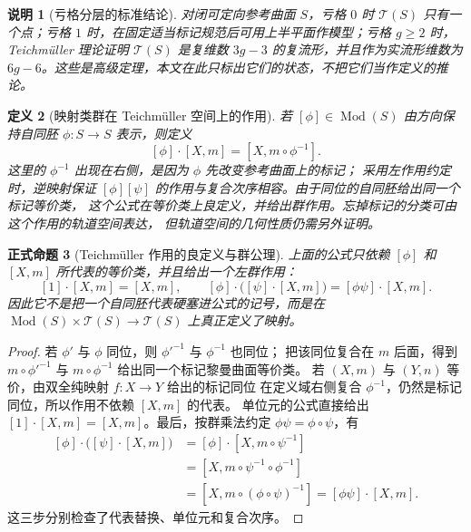 \documentclass[UTF8,fontset=none,a4paper,11pt]{ctexart}
\theoremstyle{foundation-definition}
\newtheorem{definition}{定义}[section]
\theoremstyle{foundation-theorem}
\theoremstyle{foundation-proposition}
\newtheorem{proposition}[definition]{正式命题}
\theoremstyle{foundation-example}
\theoremstyle{foundation-remark}
\newtheorem{remark}[definition]{说明}
\theoremstyle{foundation-theorem}
\newcommand{\T}{\mathcal T}
\newcommand{\Mod}{\operatorname{Mod}}
\begin{document}
\begin{remark}[亏格分层的标准结论]
对闭可定向参考曲面 \(S\)，亏格 \(0\) 时 \(\T(S)\) 只有一个点；亏格 \(1\) 时，在固定适当标记规范后可用上半平面作模型；亏格 \(g\geq2\) 时，Teichmüller 理论证明 \(\T(S)\) 是复维数 \(3g-3\) 的复流形，并且作为实流形维数为 \(6g-6\)。这些是高级定理，本文在此只标出它们的状态，不把它们当作定义的推论。
\end{remark}

\begin{definition}[映射类群在 Teichmüller 空间上的作用]\label{def:teich-action}
若 \([\phi]\in\Mod(S)\) 由方向保持自同胚 \(\phi:S\to S\) 表示，则定义
\[
[\phi]\cdot[X,m]=[X,m\circ\phi^{-1}].
\]
这里的 \(\phi^{-1}\) 出现在右侧，是因为 \(\phi\) 先改变参考曲面上的标记；
采用左作用约定时，逆映射保证
\([ \phi ][ \psi ]\) 的作用与复合次序相容。由于同位的自同胚给出同一个标记等价类，
这个公式在等价类上良定义，并给出群作用。忘掉标记的分类可由这个作用的轨道空间表达，
但轨道空间的几何性质仍需另外证明。
\end{definition}

\begin{proposition}[Teichmüller 作用的良定义与群公理]\label{prop:teich-action-well-defined}
上面的公式只依赖 \([\phi]\) 和 \([X,m]\) 所代表的等价类，并且给出一个左群作用：
\[
[1]\cdot[X,m]=[X,m],\qquad
[\phi]\cdot\bigl([\psi]\cdot[X,m]\bigr)
=[\phi\psi]\cdot[X,m].
\]
因此它不是把一个自同胚代表硬塞进公式的记号，而是在
\(\Mod(S)\times\T(S)\to\T(S)\) 上真正定义了映射。
\end{proposition}

\begin{proof}
若 \(\phi'\) 与 \(\phi\) 同位，则 \(\phi'^{-1}\) 与 \(\phi^{-1}\) 也同位；
把该同位复合在 \(m\) 后面，得到
\(m\circ\phi'^{-1}\) 与 \(m\circ\phi^{-1}\) 给出同一个标记黎曼曲面等价类。
若 \((X,m)\) 与 \((Y,n)\) 等价，由双全纯映射 \(f:X\to Y\) 给出的标记同位
在定义域右侧复合 \(\phi^{-1}\)，仍然是标记同位，所以作用不依赖 \([X,m]\) 的代表。
单位元的公式直接给出
\([1]\cdot[X,m]=[X,m]\)。最后，按群乘法约定
\(\phi\psi=\phi\circ\psi\)，有
\[
\begin{aligned}
[\phi]\cdot\bigl([\psi]\cdot[X,m]\bigr)
&=[\phi]\cdot[X,m\circ\psi^{-1}]\\
&=[X,m\circ\psi^{-1}\circ\phi^{-1}]\\
&=[X,m\circ(\phi\circ\psi)^{-1}]
=[\phi\psi]\cdot[X,m].
\end{aligned}
\]
这三步分别检查了代表替换、单位元和复合次序。
\end{proof}
\end{document}

